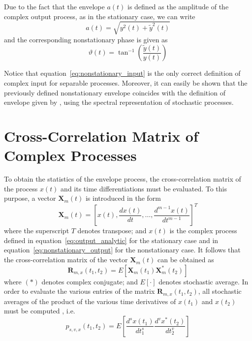 \documentclass[11pt]{article}
\begin{document}
Due to the fact that the envelope $a(t)$ is defined as the amplitude of the complex output process, as in the stationary case, we can write
\begin{equation}
a(t) = \sqrt{y^2(t) + \tilde{y}^2(t)}
\label{eq:nonstationary_envelope}
\end{equation}
and the corresponding nonstationary phase is given as
\begin{equation}
\vartheta(t) = \tan^{-1}\left(\frac{\tilde{y}(t)}{y(t)}\right)
\label{eq:nonstationary_phase}
\end{equation}

Notice that equation~\eqref{eq:nonstationary_input} is the only correct definition of complex input for separable processes. Moreover, it can easily be shown that the previously defined nonstationary envelope coincides with the definition of envelope given by \cite{yang1972}, using the \cite{priestley1967} spectral representation of stochastic processes.

\section{Cross-Correlation Matrix of Complex Processes}
\label{sec:correlation_matrix}

To obtain the statistics of the envelope process, the cross-correlation matrix of the process $x(t)$ and its time differentiations must be evaluated. To this purpose, a vector $\mathbf{X}_m(t)$ is introduced in the form
\begin{equation}
\mathbf{X}_m(t) = \left[x(t), \frac{dx(t)}{dt}, \ldots, \frac{d^{m-1}x(t)}{dt^{m-1}}\right]^T
\label{eq:vector_x}
\end{equation}
where the superscript $T$ denotes transpose; and $x(t)$ is the complex process defined in equation~\eqref{eq:output_analytic} for the stationary case and in equation~\eqref{eq:nonstationary_output} for the nonstationary case. It follows that the cross-correlation matrix of the vector $\mathbf{X}_m(t)$ can be obtained as
\begin{equation}
\mathbf{R}_{m,x}(t_1, t_2) = E[\mathbf{X}_m(t_1)\mathbf{X}_m^*(t_2)]
\label{eq:correlation_matrix}
\end{equation}
where $(*)$ denotes complex conjugate; and $E[\cdot]$ denotes stochastic average. In order to evaluate the various entries of the matrix $\mathbf{R}_{m,x}(t_1, t_2)$, all stochastic averages of the product of the various time derivatives of $x(t_1)$ and $x(t_2)$ must be computed \cite{borino1988,dipaola1985,dipaola1985b}, i.e.
\begin{equation}
p_{s,v,x}(t_1, t_2) = E\left[\frac{d^s x(t_1)}{dt_1^s} \frac{d^v x^*(t_2)}{dt_2^v}\right]
\label{eq:cross_correlation_entry}
\end{equation}
\end{document}
